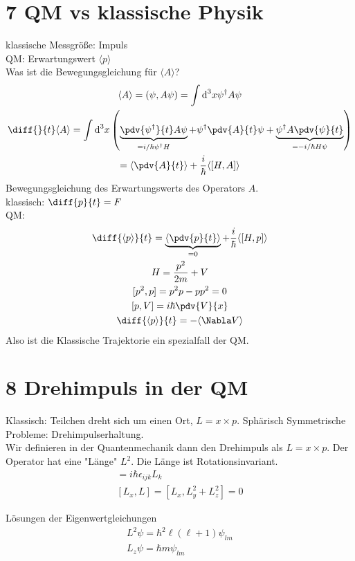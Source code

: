 
\section{7 QM vs klassische Physik}

klassische Messgröße: Impuls\\
QM: Erwartungswert $\langle p \rangle$\\
Was ist die Bewegungsgleichung für $\langle A\rangle$?
\begin{gather}
	\langle A\rangle = (\psi, A\psi) = \int \text d^3x \psi^\dagger A\psi\\
	\diff{}{t}\langle A\rangle = \int\text d^3x \left(\underbrace{\pdv{\psi^\dagger}{t}A\psi}_{= i/\hbar \psi^\dagger H} + \psi^\dagger \pdv{A}{t}\psi + \underbrace{\psi^\dagger A \pdv{\psi}{t}}_{=-i/\hbar H\psi}\right)\\
	= \langle \pdv{A}{t}\rangle + \frac{i}{\hbar}\langle[H,A]\rangle
\end{gather}
Bewegungsgleichung des Erwartungswerts des Operators $A$.\\
klassisch: $\diff{p}{t} = F$\\
QM:
\begin{gather}
	\diff{\langle p\rangle}{t} = \underbrace{\langle \pdv{p}{t}\rangle}_{=0} + \frac{i}{\hbar}\langle[H,p]\rangle\\
	H = \frac{p^2}{2m} + V\\
	[p^2, p] = p^2 p - p p^2 = 0 \\
	[p, V] = i\hbar \pdv{V}{x}\\
	\diff{\langle p \rangle}{t} = -\langle \Nabla V\rangle
\end{gather}
Also ist die Klassische Trajektorie ein spezialfall der QM.


\section{8 Drehimpuls in der QM}
Klassisch: Teilchen dreht sich um einen Ort, $L = x\times p$. Sphärisch Symmetrische Probleme: Drehimpulserhaltung.\\
Wir definieren in der Quantenmechanik dann den Drehimpuls als $L = x\times p$. Der Operator hat eine "Länge" $L^2$. Die Länge ist Rotationsinvariant.
\begin{gather}
	[L_i,L_j] = i\hbar \epsilon_{ijk} L_k\\
	[L_x, L] = [L_x,  L_y^2 + L_z^2] = 0
\end{gather}

Lösungen der Eigenwertgleichungen
\begin{gather}
	L^2 \psi = \hbar^2\ell(\ell+1)\psi_{lm}\\
	L_z \psi = \hbar m \psi_{lm}
\end{gather}

